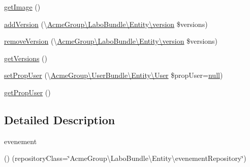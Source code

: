 \begin{DoxyCompactItemize}
\item 
\hyperlink{class_acme_group_1_1_labo_bundle_1_1_entity_1_1evenement_a41811747af9ed481ad113fc2035e4f6a}{get\+Image} ()
\item 
\hyperlink{class_acme_group_1_1_labo_bundle_1_1_entity_1_1evenement_a5d37ca1ff7f770f3e0efa6e1161ef3b0}{add\+Version} (\textbackslash{}\hyperlink{class_acme_group_1_1_labo_bundle_1_1_entity_1_1version}{Acme\+Group\textbackslash{}\+Labo\+Bundle\textbackslash{}\+Entity\textbackslash{}version} \$versions)
\item 
\hyperlink{class_acme_group_1_1_labo_bundle_1_1_entity_1_1evenement_a4099df852fe37149b460d0b5ab8a69fc}{remove\+Version} (\textbackslash{}\hyperlink{class_acme_group_1_1_labo_bundle_1_1_entity_1_1version}{Acme\+Group\textbackslash{}\+Labo\+Bundle\textbackslash{}\+Entity\textbackslash{}version} \$versions)
\item 
\hyperlink{class_acme_group_1_1_labo_bundle_1_1_entity_1_1evenement_a82c551220daf7e58b75a9eec699d9765}{get\+Versions} ()
\item 
\hyperlink{class_acme_group_1_1_labo_bundle_1_1_entity_1_1evenement_a7826167fbd256e1450c0b383105f9b04}{set\+Prop\+User} (\textbackslash{}\hyperlink{class_acme_group_1_1_user_bundle_1_1_entity_1_1_user}{Acme\+Group\textbackslash{}\+User\+Bundle\textbackslash{}\+Entity\textbackslash{}\+User} \$prop\+User=\hyperlink{validate_8js_afb8e110345c45e74478894341ab6b28e}{null})
\item 
\hyperlink{class_acme_group_1_1_labo_bundle_1_1_entity_1_1evenement_a08220d3dc3dac0ec4464fe3c5ffd64fe}{get\+Prop\+User} ()
\end{DoxyCompactItemize}


\subsection{Detailed Description}
evenement

() (repository\+Class=\char`\"{}\+Acme\+Group\textbackslash{}\+Labo\+Bundle\textbackslash{}\+Entity\textbackslash{}evenement\+Repository\char`\"{}) 

